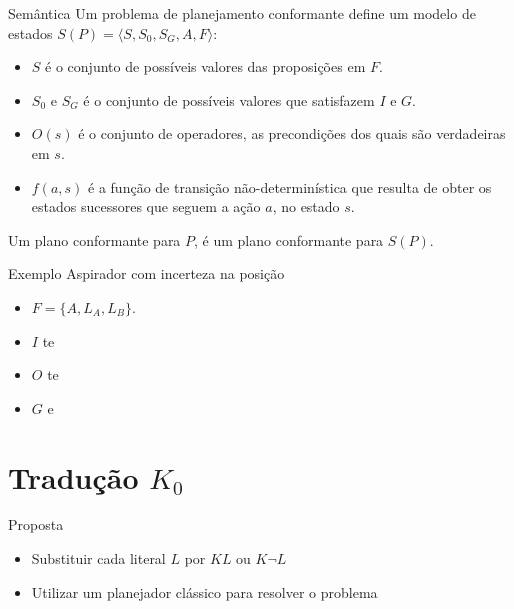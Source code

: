 \begin{frame}{Semântica}
    Um problema de planejamento conformante define um modelo de estados $S(P) = \langle S, S_0, S_G, A, F\rangle$:
    \begin{itemize}
        \item $S$ é o conjunto de possíveis valores das proposições em $F$.
        \item $S_0$ e $S_G$ é o conjunto de possíveis valores que satisfazem $I$ e $G$.
        \item $O(s)$ é o conjunto de operadores, as precondições dos quais são 
            verdadeiras em $s$.
        \item $f(a,s)$ é a função de transição não-determinística que resulta de obter 
            os estados sucessores que seguem a ação $a$, no estado $s$.
    \end{itemize}
    Um plano conformante para $P$, é um plano conformante para $S(P)$.
\end{frame}



\begin{frame}{Exemplo}
    Aspirador com incerteza na posição
    \begin{itemize}
        \item $F = \{A,L_A,L_B\}$.
        \item $I $ te 
        \item $O $ te
        \item $G $ e
    \end{itemize}

\end{frame}




\section{Tradução $K_0$}

\begin{frame}{Proposta}
    \begin{itemize}
    \item Substituir cada literal $L$ por $ KL$ ou $K \lnot L$
    \item Utilizar um planejador clássico para resolver o problema
    \end{itemize}  
\end{frame}

